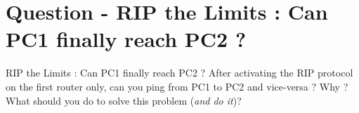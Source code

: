 \section{Question - RIP the Limits : Can PC1 finally reach PC2 ?}

\begin{questionBox}{RIP the Limits : Can PC1 finally reach PC2 ?}
    After activating the RIP protocol on the first router only, can you ping from PC1 to PC2 and vice-versa ? Why ? What should you do to solve this problem (\textit{and do it})?
\end{questionBox}

